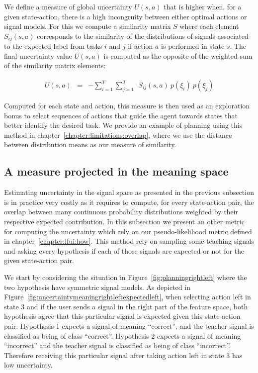 We define a measure of global uncertainty $U(s,a)$ that is higher when, for a given state-action, there is a high incongruity between either optimal actions or signal models. For this we compute a similarity matrix $S$ where each element $S_{ij}(s,a)$ corresponds to the similarity of the distributions of signals associated to the expected label from tasks $i$ and $j$ if action $a$ is performed in state $s$. The final uncertainty value $U(s,a)$ is computed as the opposite of the weighted sum of the similarity matrix elements:

\begin{eqnarray}
U(s,a) &=& - \sum_{i = 1}^{T} \sum_{j = 1}^{T} ~~ S_{ij}(s,a) ~ p(\xi_i) ~ p(\xi_j)
\end{eqnarray}

Computed for each state and action, this measure is then used as an exploration bonus to select sequences of actions that guide the agent towards states that better identify the desired task. We provide an example of planning using this method in chapter~\ref{chapter:limitations:overlap}, where we use the distance between distribution means as our measure of similarity.

\subsection{A measure projected in the meaning space}
\label{chapter:planning:uncertiantyprojected}

Estimating uncertainty in the signal space as presented in the previous subsection is in practice very costly as it requires to compute, for every state-action pair, the overlap between many continuous probability distributions weighted by their respective expected contribution. In this subsection we present an other metric for computing the uncertainty which rely on our pseudo-likelihood metric defined in chapter~\ref{chapter:lfui:how}. This method rely on sampling some teaching signals and asking every hypothesis if each of those signals are expected or not for the given state-action pair. 

We start by considering the situation in Figure~\ref{fig:planningrightleft} where the two hypothesis have symmetric signal models. As depicted in Figure~\ref{fig:uncertaintymeaningrightleftexpectedleft}, when selecting action left in state 3 and if the user sends a signal in the right part of the feature space, both hypothesis agree that this particular signal is expected given this state-action pair. Hypothesis 1 expects a signal of meaning ``correct'', and the teacher signal is classified as being of class ``correct''. Hypothesis 2 expects a signal of meaning ``incorrect'' and the teacher signal is classified as being of class ``incorrect''. Therefore receiving this particular signal after taking action left in state 3 has low uncertainty.


